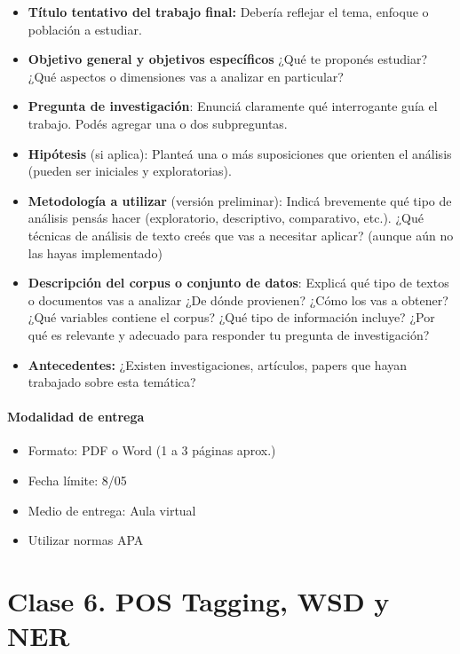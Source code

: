 \documentclass[
  letterpaper,
  DIV=11,
  numbers=noendperiod]{scrreprt}
\providecommand{\tightlist}{%
  \setlength{\itemsep}{0pt}\setlength{\parskip}{0pt}}\usepackage{longtable,booktabs,array}
\begin{document}
\begin{itemize}
\tightlist
\item
  \textbf{Título tentativo del trabajo final:} Debería reflejar el tema,
  enfoque o población a estudiar.
\item
  \textbf{Objetivo general y objetivos específicos} ¿Qué te proponés
  estudiar? ¿Qué aspectos o dimensiones vas a analizar en particular?
\item
  \textbf{Pregunta de investigación}: Enunciá claramente qué
  interrogante guía el trabajo. Podés agregar una o dos subpreguntas.
\item
  \textbf{Hipótesis} (si aplica): Planteá una o más suposiciones que
  orienten el análisis (pueden ser iniciales y exploratorias).
\item
  \textbf{Metodología a utilizar} (versión preliminar): Indicá
  brevemente qué tipo de análisis pensás hacer (exploratorio,
  descriptivo, comparativo, etc.). ¿Qué técnicas de análisis de texto
  creés que vas a necesitar aplicar? (aunque aún no las hayas
  implementado)
\item
  \textbf{Descripción del corpus o conjunto de datos}: Explicá qué tipo
  de textos o documentos vas a analizar ¿De dónde provienen? ¿Cómo los
  vas a obtener? ¿Qué variables contiene el corpus? ¿Qué tipo de
  información incluye? ¿Por qué es relevante y adecuado para responder
  tu pregunta de investigación?
\item
  \textbf{Antecedentes:} ¿Existen investigaciones, artículos, papers que
  hayan trabajado sobre esta temática?
\end{itemize}

\subsection{Modalidad de entrega}\label{modalidad-de-entrega}

\begin{itemize}
\item
  Formato: PDF o Word (1 a 3 páginas aprox.)
\item
  Fecha límite: 8/05
\item
  Medio de entrega: Aula virtual
\item
  Utilizar normas APA
\end{itemize}

\part{Clase 6. POS Tagging, WSD y NER}
\end{document}
